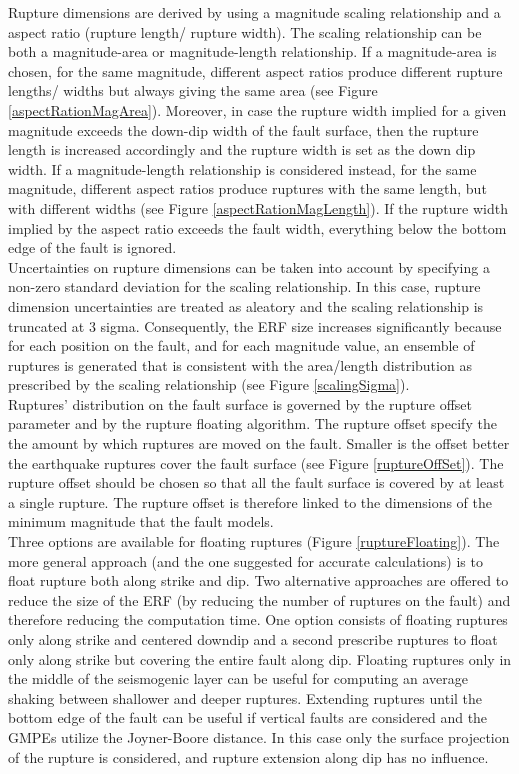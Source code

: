 Rupture dimensions are derived by using a magnitude scaling relationship and a aspect ratio (rupture length/ rupture width). The scaling relationship can be both a magnitude-area or magnitude-length relationship. If a magnitude-area is chosen, for the same magnitude, different aspect ratios produce different rupture lengths/ widths
but always giving the same area (see Figure \ref{aspectRationMagArea}). Moreover, in case the rupture width implied for a given magnitude exceeds the down-dip width of the fault surface, then the rupture length is increased accordingly and the rupture width is set as the down dip width. If a magnitude-length relationship is considered instead, for the same magnitude, different aspect ratios produce ruptures with the same length, but with different widths (see Figure \ref{aspectRationMagLength}). If the rupture width implied by the aspect ratio exceeds the fault width, everything below the bottom edge of the fault is ignored.\\
Uncertainties on rupture dimensions can be taken into account by specifying a non-zero standard deviation for the scaling relationship. In this case, rupture dimension uncertainties are treated as aleatory and the scaling relationship is truncated at 3 sigma. Consequently, the ERF size increases significantly because for each position on the fault, and for each magnitude value, an ensemble of ruptures is generated that is consistent with the area/length distribution as prescribed by the scaling relationship (see Figure \ref{scalingSigma}).\\
Ruptures' distribution on the fault surface is governed by the rupture offset parameter and by the rupture floating algorithm. The rupture offset specify the the amount by which ruptures are moved on the fault. Smaller is the offset better the earthquake ruptures cover the fault surface (see Figure \ref{ruptureOffSet}). The rupture offset should be chosen so that all the fault surface is covered by at least a single rupture. The rupture offset is therefore linked to the dimensions of the minimum magnitude that the fault models.\\
Three options are available for floating ruptures (Figure \ref{ruptureFloating}). The more general approach (and the one suggested for accurate calculations) is to float rupture both along strike and dip. Two alternative approaches are offered to reduce the size of the ERF (by reducing the number of ruptures on the fault) and therefore reducing the computation time. One option consists of floating ruptures only along strike and centered downdip and a second prescribe ruptures to float only along strike but covering the entire fault along dip. Floating ruptures only in the middle of the seismogenic layer can be useful for computing an average shaking between shallower and deeper ruptures. Extending ruptures until the bottom edge of the fault can be useful if vertical faults are considered and the GMPEs utilize the Joyner-Boore distance. In this case only the surface projection of the rupture is considered, and rupture extension along dip has no influence.\\
